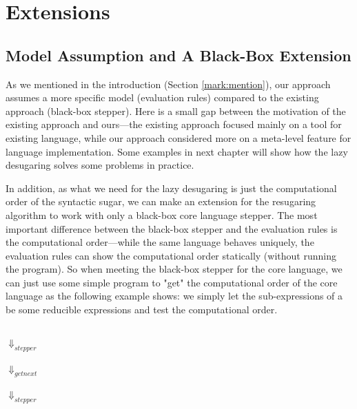 \section{Extensions}
\label{sec5}
\subsection{Model Assumption and A Black-Box Extension}


As we mentioned in the introduction (Section \ref{mark:mention}), our approach assumes a more specific model (evaluation rules) compared to the existing approach (black-box stepper). Here is a small gap between the motivation of the existing approach and ours---the existing approach focused mainly on a tool for existing language, while our approach considered more on a meta-level feature for language implementation. Some examples in next chapter will show how the lazy desugaring solves some problems in practice.

In addition, as what we need for the lazy desugaring is just the computational order of the syntactic sugar, we can make an extension for the resugaring algorithm to work with only a black-box core language stepper. The most important difference between the black-box stepper and the evaluation rules is the computational order---while the same language behaves uniquely, the evaluation rules can show the computational order statically (without running the program). So when meeting the black-box stepper for the core language, we can just use some simple program to "get" the computational order of the core language as the following example  shows: we simply let the sub-expressions of a  be some reducible expressions and test the computational order.

\begin{center}\footnotesize
	\\ $\Downarrow_{stepper}$\\ \\ $\Downarrow_{getnext}$\\ \\ $\Downarrow_{stepper}$\\ \qquad{}\\
\end{center}


